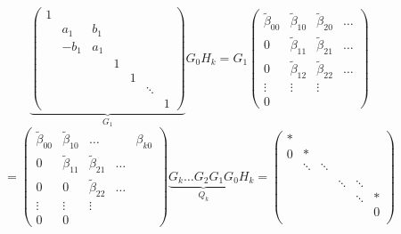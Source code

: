 \documentclass{article}
\begin{document}
\[
  \underbrace{\begin{pmatrix}
    1 & & & & & & \\
      & a_1 & b_1 & & & & \\
      & -b_1 & a_1 & & & & \\
      &      &     & 1 & & & \\
      &      &     & & 1 & & \\
      &      &     & & & \ddots & \\
      &      &     & & & & 1
  \end{pmatrix}}_{G_1}
  G_0 H_k = G_1 \begin{pmatrix}
    \tilde \beta_{00} & \tilde \beta_{10} & \tilde \beta_{20} & \ldots \\
    0                 & \tilde \beta_{11} & \tilde \beta_{21} & \ldots \\
    0                 & \tilde \beta_{12} & \tilde \beta_{22} & \ldots \\
    \vdots            & \vdots            & \vdots & \\
    0 & & &
  \end{pmatrix}
\] \[
  = \begin{pmatrix}
    \tilde \beta_{00} & \tilde \beta_{10} & \ldots   & & \beta_{k0} \\
    0                 & \tilde \beta_{11} & \tilde \beta_{21} & \ldots & \\
    0                 & 0                 & \tilde \beta_{22} & \ldots & \\
    \vdots            & \vdots            & \vdots   & & \\
    0 & 0 & & &
  \end{pmatrix}
  \underbrace{G_k \dots G_2 G_1 G_0}_{Q_k} H_k
  = \begin{pmatrix}
    * & & & & & \\
    0 & * & & & & \\
      & \ddots & \ddots & & & \\
      & & & & & \\
      & & & \ddots & \ddots & \\
      & & & & \ddots & * \\
      & & & & & 0 \\
  \end{pmatrix}
\]
\end{document}
